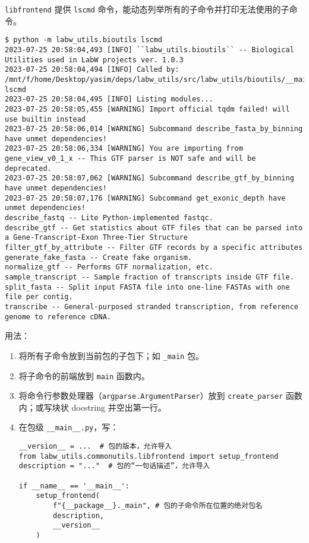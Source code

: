 \documentclass[pdf,9pt]{beamer}
\begin{document}
    \begin{frame}[fragile]{\subsubsecname}

        \Verb|libfrontend| 提供 \Verb|lscmd| 命令，能动态列举所有的子命令并打印无法使用的子命令。

        \begin{verbatim}
$ python -m labw_utils.bioutils lscmd
2023-07-25 20:58:04,493 [INFO] ``labw_utils.bioutils`` -- Biological Utilities used in LabW projects ver. 1.0.3
2023-07-25 20:58:04,494 [INFO] Called by: /mnt/f/home/Desktop/yasim/deps/labw_utils/src/labw_utils/bioutils/__main__.py lscmd
2023-07-25 20:58:04,495 [INFO] Listing modules...
2023-07-25 20:58:05,455 [WARNING] Import official tqdm failed! will use builtin instead
2023-07-25 20:58:06,014 [WARNING] Subcommand describe_fasta_by_binning have unmet dependencies!
2023-07-25 20:58:06,334 [WARNING] You are importing from gene_view_v0_1_x -- This GTF parser is NOT safe and will be deprecated.
2023-07-25 20:58:07,062 [WARNING] Subcommand describe_gtf_by_binning have unmet dependencies!
2023-07-25 20:58:07,176 [WARNING] Subcommand get_exonic_depth have unmet dependencies!
describe_fastq -- Lite Python-implemented fastqc.
describe_gtf -- Get statistics about GTF files that can be parsed into a Gene-Transcript-Exon Three-Tier Structure
filter_gtf_by_attribute -- Filter GTF records by a specific attributes
generate_fake_fasta -- Create fake organism.
normalize_gtf -- Performs GTF normalization, etc.
sample_transcript -- Sample fraction of transcripts inside GTF file.
split_fasta -- Split input FASTA file into one-line FASTAs with one file per contig.
transcribe -- General-purposed stranded transcription, from reference genome to reference cDNA.
        \end{verbatim}
    \end{frame}
    
    \begin{frame}[fragile]{\subsubsecname}
    用法：

    \begin{enumerate}
        \item 将所有子命令放到当前包的子包下；如 \Verb|_main| 包。
        \item 将子命令的前端放到 \Verb|main| 函数内。
        \item 将命令行参数处理器（\Verb|argparse.ArgumentParser|）放到 \Verb|create_parser| 函数内；或写块状 docstring 并空出第一行。
        \item 在包级 \Verb|__main__.py|，写：
        
        \begin{verbatim}
__version__ = ...  # 包的版本，允许导入
from labw_utils.commonutils.libfrontend import setup_frontend
description = "..."  # 包的“一句话描述”，允许导入

if __name__ == '__main__':
    setup_frontend(
        f"{__package__}._main", # 包的子命令所在位置的绝对包名
        description,
        __version__
    )
        \end{verbatim}
    \end{enumerate}
    \end{frame}
\end{document}
